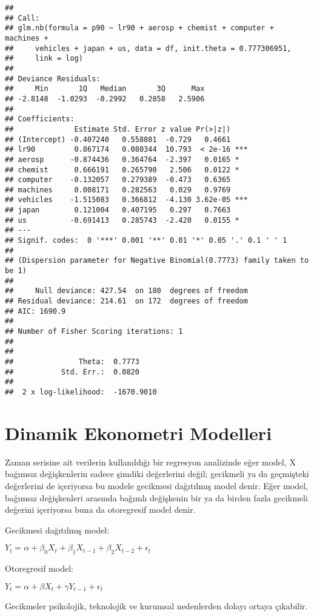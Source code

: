\documentclass[
]{book}
\begin{document}
\begin{verbatim}
## 
## Call:
## glm.nb(formula = p90 ~ lr90 + aerosp + chemist + computer + machines + 
##     vehicles + japan + us, data = df, init.theta = 0.777306951, 
##     link = log)
## 
## Deviance Residuals: 
##     Min       1Q   Median       3Q      Max  
## -2.8148  -1.0293  -0.2992   0.2858   2.5906  
## 
## Coefficients:
##              Estimate Std. Error z value Pr(>|z|)    
## (Intercept) -0.407240   0.558801  -0.729   0.4661    
## lr90         0.867174   0.080344  10.793  < 2e-16 ***
## aerosp      -0.874436   0.364764  -2.397   0.0165 *  
## chemist      0.666191   0.265790   2.506   0.0122 *  
## computer    -0.132057   0.279389  -0.473   0.6365    
## machines     0.008171   0.282563   0.029   0.9769    
## vehicles    -1.515083   0.366812  -4.130 3.62e-05 ***
## japan        0.121004   0.407195   0.297   0.7663    
## us          -0.691413   0.285743  -2.420   0.0155 *  
## ---
## Signif. codes:  0 '***' 0.001 '**' 0.01 '*' 0.05 '.' 0.1 ' ' 1
## 
## (Dispersion parameter for Negative Binomial(0.7773) family taken to be 1)
## 
##     Null deviance: 427.54  on 180  degrees of freedom
## Residual deviance: 214.61  on 172  degrees of freedom
## AIC: 1690.9
## 
## Number of Fisher Scoring iterations: 1
## 
## 
##               Theta:  0.7773 
##           Std. Err.:  0.0820 
## 
##  2 x log-likelihood:  -1670.9010
\end{verbatim}

\hypertarget{dinamik-ekonometri-modelleri}{%
\chapter{Dinamik Ekonometri Modelleri}\label{dinamik-ekonometri-modelleri}}

Zaman serisine ait verilerin kullanıldığı bir regresyon analizinde eğer model, X bağımsız değişkenlerin sadece şimdiki değerlerini değil; gecikmeli ya da geçmişteki değerlerini de içeriyorsa bu modele gecikmesi dağıtılmış model denir. Eğer model, bağımsız değişkenleri arasında bağımlı değişkenin bir ya da birden fazla gecikmeli değerini içeriyorsa buna da otoregresif model denir.

Gecikmesi dağıtılmış model:

\(Y_t = \alpha + \beta_0X_t + \beta_1X_{t-1} + \beta_2X_{t-2} + \epsilon_t\)

Otoregresif model:

\(Y_t = \alpha + \beta X_t + \gamma Y_{t-1} + \epsilon_t\)

Gecikmeler psikolojik, teknolojik ve kurumsal nedenlerden dolayı ortaya çıkabilir.
\end{document}
